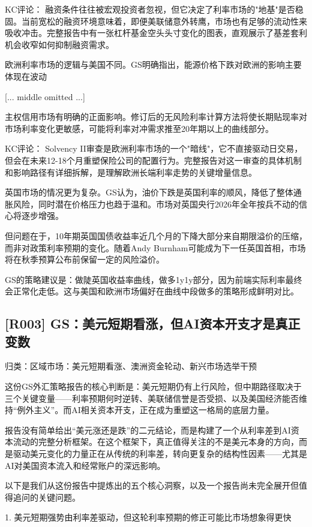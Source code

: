 \documentclass[11pt]{ctexart}
\begin{document}
KC评论： 融资条件往往被宏观投资者忽视，但它决定了利率市场的"地基"是否稳固。当前宽松的融资环境意味着，即便美联储意外转鹰，市场也有足够的流动性来吸收冲击。完整报告中有一张杠杆基金空头头寸变化的图表，直观展示了基差套利机会收窄如何抑制融资需求。

欧洲利率市场的逻辑与美国不同。GS明确指出，能源价格下跌对欧洲的影响主要体现在波动

[... middle omitted ...]

主权信用市场有明确的正面影响。修订后的无风险利率计算方法将使长期贴现率对市场利率变化更敏感，可能将利率对冲需求推至20年期以上的曲线部分。

KC评论： Solvency II审查是欧洲利率市场的一个"暗线"，它不直接驱动日交易，但会在未来12-18个月重塑保险公司的配置行为。完整报告对这一审查的具体机制和影响路径有详细拆解，是理解欧洲长端利率走势的关键增量信息。

英国市场的情况更为复杂。GS认为，油价下跌是英国利率的顺风，降低了整体通胀风险，同时潜在价格压力也趋于温和。市场对英国央行2026年全年按兵不动的信心将逐步增强。

但问题在于，10年期英国国债收益率近几个月的下降大部分来自期限溢价的压缩，而非对政策利率预期的变化。随着Andy Burnham可能成为下一任英国首相，市场将在秋季预算公布前保留一定的风险溢价。

GS的策略建议是：做陡英国收益率曲线，做多1y1y部分，因为前端实际利率最终会正常化走低。这与美国和欧洲市场偏好在曲线中段做多的策略形成鲜明对比。

\subsection{[R003] GS：美元短期看涨，但AI资本开支才是真正变数}
{\small\color{refgray}归类：区域市场：美元短期看涨、澳洲资金轮动、新兴市场选举干预}

这份GS外汇策略报告的核心判断是：美元短期仍有上行风险，但中期路径取决于三个关键变量——利率预期何时逆转、美联储信誉是否受损、以及美国经济能否维持“例外主义”。而AI相关资本开支，正在成为重塑这一格局的底层力量。

报告没有简单给出“美元涨还是跌”的二元结论，而是构建了一个从利率差到AI资本流动的完整分析框架。在这个框架下，真正值得关注的不是美元本身的方向，而是驱动美元变化的力量正在从传统的利率差，转向更复杂的结构性因素——尤其是AI对美国资本流入和经常账户的深远影响。

以下是我们从这份报告中提炼出的五个核心洞察，以及一个报告尚未完全展开但值得追问的关键问题。

1. 美元短期强势由利率差驱动，但这轮利率预期的修正可能比市场想象得更快
\end{document}
